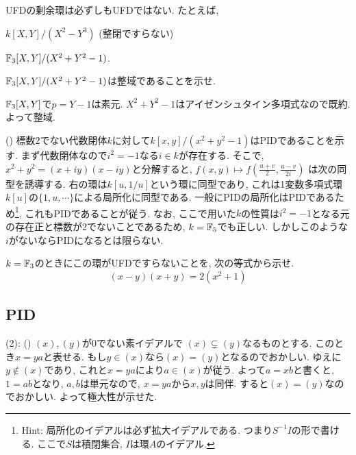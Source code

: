 \begin{eg}
UFDの剰余環は必ずしもUFDではない. たとえば,
\ben
\item $k[X,Y]/(X^2-Y^3)$ (整閉ですらない)
\item $\mathbb{F}_{3}[X,Y]/(X^2+Y^2-1)$.
\een
\end{eg}

\begin{egprob}
$\mathbb{F}_{3}[X,Y]/(X^2+Y^2-1)$は整域であることを示せ.
\end{egprob}
\begin{egans}
$\mathbb{F}_{3}[X,Y]$で$p=Y-1$は素元. $X^2+Y^2-1$はアイゼンシュタイン多項式なので既約. よって整域.
\end{egans}




\begin{eg} ()
標数2でない代数閉体$k$に対して$k[x,y]/(x^2+y^2-1)$はPIDであることを示す. まず代数閉体なので$i^2=-1$なる$i\in k$が存在する. そこで, $x^2+y^2=(x+iy)(x-iy)$と分解すると, $f(x,y) \mapsto f(\frac{u+v}{2}, \frac{u-v}{2i})$ は次の同型を誘導する.
右の環は$k[u,1/u]$という環に同型であり, これは1変数多項式環$k[u]$の$\{ 1,u,\cdots\}$による局所化に同型である. 一般にPIDの局所化はPIDであるため\footnote{Hint: 局所化のイデアルは必ず拡大イデアルである. つまり$S^{-1}I$の形で書ける. ここで$S$は積閉集合, $I$は環$A$のイデアル.}, これもPIDであることが従う. なお, ここで用いた$k$の性質は$i^2=-1$となる元の存在正と標数が$2$でないことであるため, $k=\mathbb{F}_{5}$でも正しい. しかしこのような$i$がないならPIDになるとは限らない.
\end{eg}
\begin{prac}
$k=\mathbb{F}_{3}$のときにこの環がUFDですらないことを, 次の等式から示せ.
\[(x-y)(x+y) = 2(x^2+1)\]
\end{prac}








\subsection{PID}


\prf
(2): () $(x),(y)$が0でない素イデアルで $(x)\subsetneq (y)$なるものとする.  このとき$x=ya$と表せる. もし$y\in (x)$なら$(x)=(y)$となるのでおかしい. ゆえに$y\notin (x)$であり, これと$x=ya$により$a\in (x)$が従う. よって$a=xb$と書くと, $1=ab$となり, $a,b$は単元なので, $x=ya$から$x,y$は同伴. すると$(x) = (y)$なのでおかしい. よって極大性が示せた.

